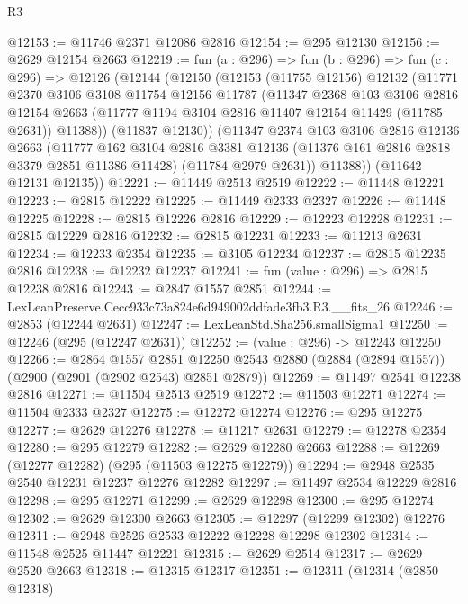 \begin{lexlean}{R3}
\begin{coremodule}
@12153 := @11746 @2371 @12086 @2816
@12154 := @295 @12130
@12156 := @2629 @12154 @2663
@12219 := fun (a : @296) =>
  fun (b : @296) =>
  fun (c : @296) =>
  @12126
    (@12144
      (@12150
        (@12153
          (@11755 @12156)
          @12132
          (@11771
            @2370
            @3106
            @3108
            @11754
            @12156
            @11787
            (@11347
              @2368
              @103
              @3106
              @2816
              @12154
              @2663
              (@11777 @1194 @3104 @2816 @11407 @12154 @11429 (@11785 @2631))
              @11388))
          (@11837 @12130))
        (@11347
          @2374
          @103
          @3106
          @2816
          @12136
          @2663
          (@11777
            @162
            @3104
            @2816
            @3381
            @12136
            (@11376 @161 @2816 @2818 @3379 @2851 @11386 @11428)
            (@11784 @2979 @2631))
          @11388))
      (@11642 @12131 @12135))
@12221 := @11449 @2513 @2519
@12222 := @11448 @12221
@12223 := @2815 @12222
@12225 := @11449 @2333 @2327
@12226 := @11448 @12225
@12228 := @2815 @12226 @2816
@12229 := @12223 @12228
@12231 := @2815 @12229 @2816
@12232 := @2815 @12231
@12233 := @11213 @2631
@12234 := @12233 @2354
@12235 := @3105 @12234
@12237 := @2815 @12235 @2816
@12238 := @12232 @12237
@12241 := fun (value : @296) => @2815 @12238 @2816
@12243 := @2847 @1557 @2851
@12244 := LexLeanPreserve.Cecc933c73a824e6d949002ddfade3fb3.R3.__fits_26
@12246 := @2853 (@12244 @2631)
@12247 := LexLeanStd.Sha256.smallSigma1
@12250 := @12246 (@295 (@12247 @2631))
@12252 := (value : @296) -> @12243 @12250
@12266 := @2864
    @1557
    @2851
    @12250
    @2543
    @2880
    (@2884 (@2894 @1557))
    (@2900 (@2901 (@2902 @2543) @2851 @2879))
@12269 := @11497 @2541 @12238 @2816
@12271 := @11504 @2513 @2519
@12272 := @11503 @12271
@12274 := @11504 @2333 @2327
@12275 := @12272 @12274
@12276 := @295 @12275
@12277 := @2629 @12276
@12278 := @11217 @2631
@12279 := @12278 @2354
@12280 := @295 @12279
@12282 := @2629 @12280 @2663
@12288 := @12269 (@12277 @12282) (@295 (@11503 @12275 @12279))
@12294 := @2948 @2535 @2540 @12231 @12237 @12276 @12282
@12297 := @11497 @2534 @12229 @2816
@12298 := @295 @12271
@12299 := @2629 @12298
@12300 := @295 @12274
@12302 := @2629 @12300 @2663
@12305 := @12297 (@12299 @12302) @12276
@12311 := @2948 @2526 @2533 @12222 @12228 @12298 @12302
@12314 := @11548 @2525 @11447 @12221
@12315 := @2629 @2514
@12317 := @2629 @2520 @2663
@12318 := @12315 @12317
@12351 := @12311
    (@12314
      (@2850 @12318)

\end{coremodule}
\end{lexlean}
